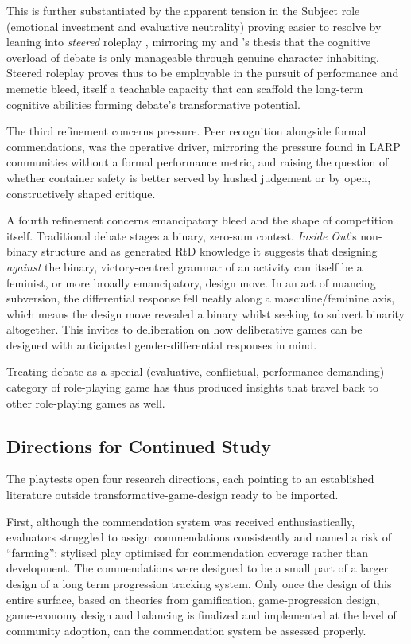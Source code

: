 This is further substantiated by the apparent tension in the Subject role (emotional investment and evaluative neutrality) proving easier to resolve by leaning into \textit{steered} roleplay \parencite{montola2015steering, pohjola2015steering}, mirroring my and \textcite{seo2022good}'s thesis that the cognitive overload of debate is only manageable through genuine character inhabiting. Steered roleplay proves thus to be employable in the pursuit of performance and memetic bleed, itself a teachable capacity that can scaffold the long-term cognitive abilities forming debate's transformative potential.

The third refinement concerns pressure. Peer recognition alongside formal commendations, was the operative driver, mirroring the pressure found in LARP communities without a formal performance metric, and raising the question of whether container safety is better served by hushed judgement or by open, constructively shaped critique.

A fourth refinement concerns emancipatory bleed and the shape of competition itself. Traditional debate stages a binary, zero-sum contest. \emph{Inside Out}'s non-binary structure and as generated RtD knowledge it suggests that designing \emph{against} the binary, victory-centred grammar of an activity can itself be a feminist, or more broadly emancipatory, design move. In an act of nuancing subversion, the differential response fell neatly along a masculine/feminine axis, which means the design move revealed a binary whilst seeking to subvert binarity altogether. This invites to deliberation on how deliberative games can be designed with anticipated gender-differential responses in mind.

Treating debate as a special (evaluative, conflictual, performance-demanding) category of role-playing game has thus produced insights that travel back to other role-playing games as well.

\subsection{Directions for Continued Study}
\label{sec:further-study}

The playtests open four research directions, each pointing to an established literature outside transformative-game-design ready to be imported.

First, although the commendation system was received enthusiastically, evaluators struggled to assign commendations consistently and named a risk of ``farming'': stylised play optimised for commendation coverage rather than development. The commendations were designed to be a small part of a larger design of a long term progression tracking system. Only once the design of this entire surface, based on theories from gamification, game-progression design, game-economy design and balancing is finalized and implemented at the level of community adoption, can the commendation system be assessed properly.

